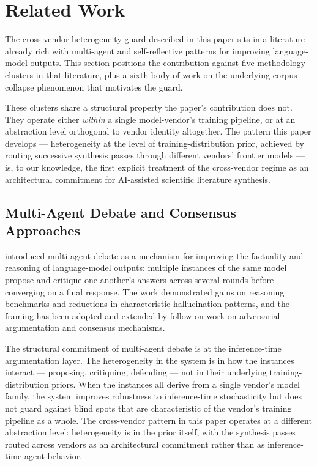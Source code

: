 
\section{Related Work}
\label{sec:related-work}

The cross-vendor heterogeneity guard described in this paper sits in a literature already rich with multi-agent and self-reflective patterns for improving language-model outputs. This section positions the contribution against five methodology clusters in that literature, plus a sixth body of work on the underlying corpus-collapse phenomenon that motivates the guard.

These clusters share a structural property the paper's contribution does not. They operate either \emph{within} a single model-vendor's training pipeline, or at an abstraction level orthogonal to vendor identity altogether. The pattern this paper develops --- heterogeneity at the level of training-distribution prior, achieved by routing successive synthesis passes through different vendors' frontier models --- is, to our knowledge, the first explicit treatment of the cross-vendor regime as an architectural commitment for AI-assisted scientific literature synthesis.

\subsection{Multi-Agent Debate and Consensus Approaches}

\citet{du2023improving} introduced multi-agent debate as a mechanism for improving the factuality and reasoning of language-model outputs: multiple instances of the same model propose and critique one another's answers across several rounds before converging on a final response. The work demonstrated gains on reasoning benchmarks and reductions in characteristic hallucination patterns, and the framing has been adopted and extended by follow-on work on adversarial argumentation and consensus mechanisms.

The structural commitment of multi-agent debate is at the inference-time argumentation layer. The heterogeneity in the system is in how the instances interact --- proposing, critiquing, defending --- not in their underlying training-distribution priors. When the instances all derive from a single vendor's model family, the system improves robustness to inference-time stochasticity but does not guard against blind spots that are characteristic of the vendor's training pipeline as a whole. The cross-vendor pattern in this paper operates at a different abstraction level: heterogeneity is in the prior itself, with the synthesis passes routed across vendors as an architectural commitment rather than as inference-time agent behavior.

